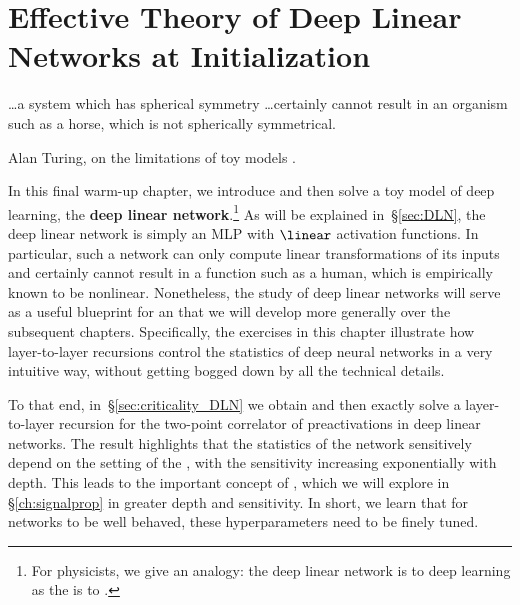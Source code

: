 

\chapter{Effective Theory of Deep Linear Networks at Initialization}\label{ch:deep-linear-eft}
\epigraph{\dots a system which has spherical symmetry \dots certainly cannot result in an organism such as a horse, which is not spherically symmetrical. %
}{Alan Turing, on %
the limitations of toy models \cite{turing1952chemical}.}

\noindent{}In this final warm-up chapter, we introduce and then solve a toy model of deep learning, the \textbf{deep linear network}.\footnote{For physicists, we give an analogy: the deep linear network is to deep learning as the  is to .} As will be explained in~\S\ref{sec:DLN}, the deep linear network is simply an MLP with $\linear$ activation functions. 
In particular, such a network can only 
compute
linear transformations of its inputs 
and certainly cannot result in a function such as a human, which is empirically known to be nonlinear.
Nonetheless, the study of deep linear networks will serve as a useful blueprint for an  that we will develop more generally over the subsequent chapters. %
Specifically, the exercises in this chapter illustrate how layer-to-layer recursions control the statistics of deep neural networks in a very intuitive way,
without getting bogged down by all the technical details.


To that end, in~\S\ref{sec:criticality_DLN} we obtain and then exactly solve a layer-to-layer recursion for the two-point correlator of preactivations in deep linear networks.
The result highlights that the statistics of the network sensitively depend on the setting of the , with the sensitivity increasing exponentially with depth.
This leads to the important concept of , which we will explore in \S\ref{ch:signalprop} in greater depth and sensitivity. In short, we learn that for networks to be well behaved, these hyperparameters need to be finely tuned. 


